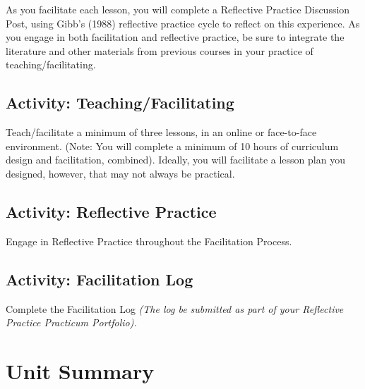 \documentclass[
]{book}
\begin{document}
As you facilitate each lesson, you will complete a Reflective Practice Discussion Post, using Gibb's (1988) reflective practice cycle to reflect on this experience. As you engage in both facilitation and reflective practice, be sure to integrate the literature and other materials from previous courses in your practice of teaching/facilitating.

\hypertarget{activity-teachingfacilitating}{%
\subsection*{Activity: Teaching/Facilitating}\label{activity-teachingfacilitating}}

\begin{reflect}
Teach/facilitate a minimum of three lessons, in an online or face-to-face environment. (Note: You will complete a minimum of 10 hours of curriculum design and facilitation, combined). Ideally, you will facilitate a lesson plan you designed, however, that may not always be practical.
\end{reflect}

\hypertarget{activity-reflective-practice}{%
\subsection*{Activity: Reflective Practice}\label{activity-reflective-practice}}

\begin{reflect}
Engage in Reflective Practice throughout the Facilitation Process.
\end{reflect}

\hypertarget{activity-facilitation-log}{%
\subsection*{Activity: Facilitation Log}\label{activity-facilitation-log}}

\begin{reflect}
Complete the Facilitation Log \emph{(The log be submitted as part of your Reflective Practice Practicum Portfolio).}
\end{reflect}

\hypertarget{unit-summary-3}{%
\section*{Unit Summary}\label{unit-summary-3}}
\end{document}
